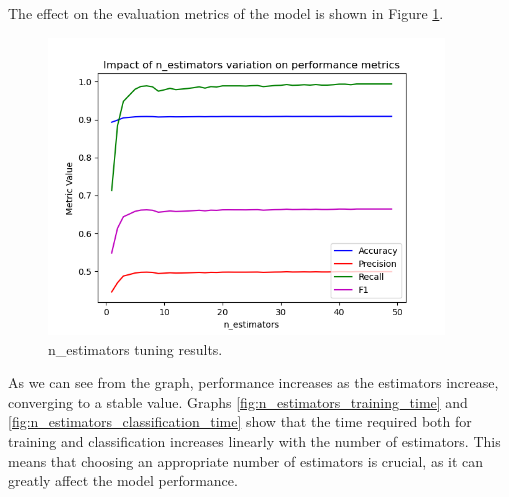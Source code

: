 \documentclass[futureinternet,article,submit,pdftex,moreauthors]{Definitions/mdpi}
\begin{document}
The effect on the evaluation metrics of the model is shown in Figure \ref{fig:n_estimators_tuning}.

\begin{figure}[H]
	\centering
	\includegraphics[width=10.5cm]{img/nEstimatorsTuning.png}
	\caption{n\_estimators tuning results.}\label{fig:n_estimators_tuning}
\end{figure}
\unskip

As we can see from the graph, performance increases as the estimators increase, converging to a stable value. 
Graphs \ref{fig:n_estimators_training_time} and \ref{fig:n_estimators_classification_time} show that the time required both for training and classification increases linearly with the number of estimators.
This means that choosing an appropriate number of estimators is crucial, as it can greatly affect the model performance. 
\end{document}
